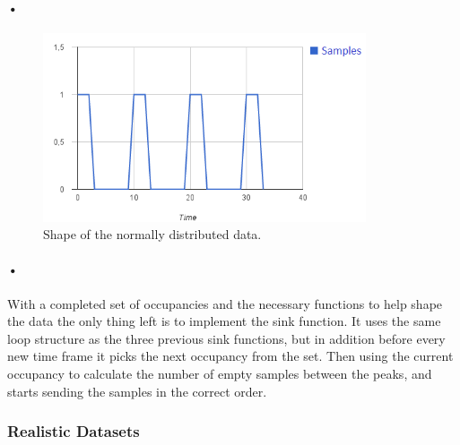 \documentclass[a4paper, 12pt, openright, twoside]{report}
\begin{document}
\paragraph{•}
\begin{figure}[h!]
	\centering
		\includegraphics[width=0.85\textwidth]{images/normal-data-shape.png}
		\caption{Shape of the normally distributed data.}
		\label{fig:normal-data-shape}
\end{figure}


\begin{minipage}{\linewidth}

\end{minipage}

\paragraph{•}
With a completed set of occupancies and the necessary functions to help shape the data the only thing left is to implement the sink function.
It uses the same loop structure as the three previous sink functions, but in addition before every new time frame it picks the next occupancy from the set.
Then using the current occupancy to calculate the number of empty samples between the peaks, and starts sending the samples in the correct order.

\subsubsection{Realistic Datasets}
\label{subsubsec:real-data}
\end{document}
